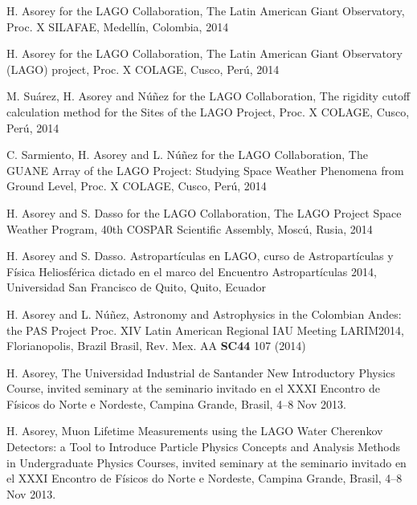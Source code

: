 \begin{etaremune}
\item {}H. Asorey for the LAGO Collaboration, {{The Latin American Giant Observatory}}, \en Proc.
X SILAFAE, Medellín, Colombia, 2014

\item {}H. Asorey for the LAGO Collaboration, {{The Latin American Giant Observatory (LAGO) project}}, \en Proc.
X COLAGE, Cusco, Perú, 2014

\item {}M. Suárez, H. Asorey and Núñez for the LAGO Collaboration, {{The rigidity cutoff calculation method for the Sites of the LAGO Project}}, \en Proc.
X COLAGE, Cusco, Perú, 2014

\item {}C. Sarmiento, H. Asorey and L. Núñez for the LAGO Collaboration, {{The GUANE Array of the LAGO Project: Studying Space Weather Phenomena from Ground Level}}, \en Proc.
X COLAGE, Cusco, Perú, 2014

\item {}H. Asorey and S. Dasso for the LAGO Collaboration, {{The LAGO Project Space Weather Program}}, \en 40th COSPAR Scientific Assembly, Moscú, Rusia, 2014

\item {}H. Asorey and S. Dasso. {{Astropartículas en LAGO}}, curso de Astropartículas y Física Heliosférica dictado en el marco del Encuentro Astropartículas 2014, Universidad San Francisco de Quito, Quito, Ecuador

\item {}H. Asorey and L. Núñez, {{Astronomy and Astrophysics in the Colombian Andes: the PAS Project}} \en Proc.
XIV Latin American Regional IAU Meeting LARIM2014, Florianopolis, \ifeng Brazil \else Brasil\fi, Rev.
Mex.
AA {\textbf{SC44}} 107 (2014)

\item {} H. Asorey, {{The Universidad Industrial de Santander New Introductory Physics Course}}, 
\ifeng
invited seminary at the
\else
seminario invitado en el
\fi
XXXI Encontro de Físicos do Norte e Nordeste, Campina Grande, Brasil, 4--8 Nov 2013.

\item {} H. Asorey, {{Muon Lifetime Measurements using the LAGO Water Cherenkov Detectors: a Tool to Introduce Particle Physics Concepts and Analysis Methods in Undergraduate Physics Courses}}, 
\ifeng
invited seminary at the
\else
seminario invitado en el
\fi
XXXI Encontro de Físicos do Norte e Nordeste, Campina Grande, Brasil, 4--8 Nov 2013.


\end{etaremune}
